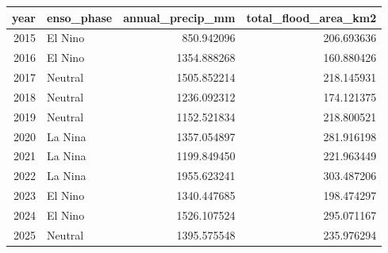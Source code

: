 \begin{tabular}{rlrr}
\toprule
year & enso\_phase & annual\_precip\_mm & total\_flood\_area\_km2 \\
\midrule
2015 & El Nino & 850.942096 & 206.693636 \\
2016 & El Nino & 1354.888268 & 160.880426 \\
2017 & Neutral & 1505.852214 & 218.145931 \\
2018 & Neutral & 1236.092312 & 174.121375 \\
2019 & Neutral & 1152.521834 & 218.800521 \\
2020 & La Nina & 1357.054897 & 281.916198 \\
2021 & La Nina & 1199.849450 & 221.963449 \\
2022 & La Nina & 1955.623241 & 303.487206 \\
2023 & El Nino & 1340.447685 & 198.474297 \\
2024 & El Nino & 1526.107524 & 295.071167 \\
2025 & Neutral & 1395.575548 & 235.976294 \\
\bottomrule
\end{tabular}
